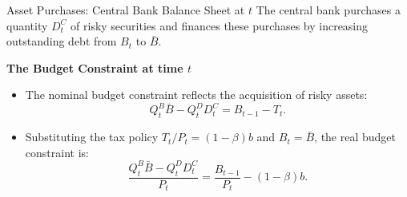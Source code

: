 \documentclass[11pt,aspectratio=169]{beamer}
\begin{document}
\begin{frame}{Asset Purchases: Central Bank Balance Sheet at $t$}
\small
The central bank purchases a quantity $D_t^C$ of risky securities and finances these purchases by increasing outstanding debt from $B_t$ to $\bar{B}$.

\vspace{0.3cm}
\textbf{The Budget Constraint at time $t$}
\begin{itemize}
    \item The nominal budget constraint reflects the acquisition of risky assets:
    \begin{equation}
    Q_{t}^{B}\bar{B}-Q_{t}^{D}D_{t}^{C}=B_{t-1}-T_{t}.
    \end{equation}
    \item Substituting the tax policy $T_t/P_t = (1-\beta)b$ and $B_t = \bar{B}$, the real budget constraint is:
    \begin{equation}
    \frac{Q_{t}^{B}\bar{B}-Q_{t}^{D}D_{t}^{C}}{P_{t}}=\frac{B_{t-1}}{P_{t}}-(1-\beta )b. \label{RealBudget_AP}
    \end{equation}
\end{itemize}
\end{frame}
\end{document}
